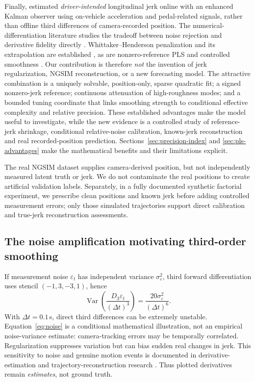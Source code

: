 Finally, \citet{bisoffi2017jerk} estimated \emph{driver-intended}
longitudinal jerk online with an enhanced Kalman observer using
on-vehicle acceleration and pedal-related signals, rather than
offline third differences of camera-recorded position.
The numerical-differentiation literature studies the tradeoff
between noise rejection and derivative fidelity directly
\citep{ahnert2007,chartrand2011,vanbreugel2020}.
Whittaker--Henderson penalization and its extrapolation are
established \citep{whittaker1923,biessy2026}, as are
nonzero-reference PLS and controlled smoothness
\citep{guerrero2007,guerrero2008}.
Our contribution is therefore \emph{not} the invention of
jerk regularization, NGSIM reconstruction, or a new forecasting
model. The attractive combination is a uniquely solvable,
position-only, sparse quadratic fit; a signed nonzero-jerk
reference; continuous attenuation of high-roughness modes;
and a bounded tuning coordinate that links smoothing
strength to conditional effective complexity and
relative precision. These established advantages make
the model useful to investigate, while the new evidence
is a controlled study of reference-jerk shrinkage,
conditional relative-noise calibration, known-jerk
reconstruction and real recorded-position prediction.
Sections~\ref{sec:precision-index} and
\ref{sec:pls-advantages} make the mathematical
benefits and their limitations explicit.

The real NGSIM dataset supplies camera-derived position, but not independently measured latent truth or jerk. We do not contaminate the real positions to create artificial validation labels. Separately, in a fully documented synthetic factorial experiment, we prescribe clean positions and known jerk before adding controlled measurement errors; only those simulated trajectories support direct calibration and true-jerk reconstruction assessments.

\subsection{The noise amplification motivating third-order smoothing}
If measurement noise $\varepsilon_t$ has independent variance $\sigma_\varepsilon^2$, third forward differentiation uses stencil $(-1,3,-3,1)$, hence
\begin{equation}\label{eq:noise}
\operatorname{Var}\!\left(
\frac{D_3\varepsilon_t}{(\Delta t)^3}\right)
=\frac{20\sigma_\varepsilon^2}{(\Delta t)^6}.
\end{equation}
With $\Delta t=0.1$\,s, direct third differences can be extremely unstable. Equation~\eqref{eq:noise} is a conditional mathematical illustration, not an empirical noise-variance estimate: camera-tracking errors may be temporally correlated. Regularization suppresses variation but can bias sudden real changes in jerk.
This sensitivity to noise and genuine motion events is documented
in derivative-estimation and trajectory-reconstruction research
\citep{vanbreugel2020,montanino2013,fan2024}.
Thus plotted derivatives remain \emph{estimates}, not ground truth.
